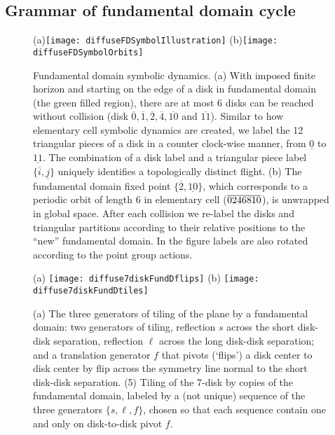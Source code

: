 \documentclass[aps,pre,
                showpacs,
                twocolumn,
                groupedaddress,
                floatfix]{revtex4-1}
\begin{document}
\subsection{Grammar of fundamental domain cycle}
\begin{figure}[htbp]
  (a)\texttt{[image: diffuseFDSymbolIllustration]}
  (b)\texttt{[image: diffuseFDSymbolOrbits]}

  \caption{\label{fig-fdflights} Fundamental domain symbolic dynamics. (a) With
  imposed finite horizon and starting on the edge of a disk in fundamental
  domain (the green filled region), there are at most 6 disks can be reached
  without collision (disk
  $\overline{0},\overline{1},\overline{2},\overline{4},\overline{10}$ and
  $\overline{11}$). Similar to how elementary cell symbolic dynamics are
  created, we label the 12 triangular pieces of a disk in a counter clock-wise
  manner, from $\underline{0}$ to $\underline{11}$. The combination of a disk
  label and a triangular piece label $\{\overline{i},\underline{j}\}$ uniquely
  identifies a topologically distinct flight. (b) The fundamental domain fixed 
  point $\{\overline{2},\underline{10}\}$, which corresponds to a periodic 
  orbit of length 6 in elementary cell (${\overline{0246810}}$), is unwrapped in 
  global space. After each collision we re-label the disks and triangular 
  partitions according to their relative positions to the ``new'' fundamental 
  domain. In the figure labels are also rotated according to the point 
  group actions.}
\end{figure}

\begin{figure}[htbp]
  \begin{center}
    (a) \texttt{[image: diffuse7diskFundDflips]}
    (b) \texttt{[image: diffuse7diskFundDtiles]}
  \end{center}
  \caption{\label{fig-7diskFundDflips} (a) The three generators of tiling of the
  plane by a fundamental domain: two generators of  tiling, reflection
  $s$ across the short disk-disk separation, reflection $\ell$ across the long
  disk-disk separation; and a translation generator $f$ that pivots (`flips') a
  disk center to disk center by flip across the symmetry line normal to the
  short disk-disk separation. (5) Tiling of the 7-disk by copies of the
  fundamental domain, labeled by a (not unique) sequence of the three generators
  $\{s,\ell,f\}$, chosen so that each sequence contain one and only on
  disk-to-disk pivot $f$. }
\end{figure}
\end{document}
